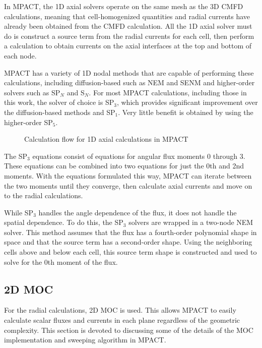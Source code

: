 In MPACT, the 1D axial solvers operate on the same mesh as the 3D CMFD calculations, meaning that cell-homogenized quantities and radial currents have already been obtained from the CMFD calculation.  All the 1D axial solver must do is construct a source term from the radial currents for each cell, then perform a calculation to obtain currents on the axial interfaces at the top and bottom of each node.

MPACT has a variety of 1D nodal methods that are capable of performing these calculations, including diffusion-based such as NEM and SENM and higher-order solvers such as SP$_N$ and S$_N$.  For most MPACT calculations, including those in this work, the solver of choice is SP$_3$, which provides significant improvement over the diffusion-based methods and SP$_1$.  Very little benefit is obtained by using the higher-order SP$_5$.

\begin{figure}[h]
  \centering
  
  \caption{Calculation flow for 1D axial calculations in MPACT}\label{f:Axial-flowchart}
\end{figure}

The SP$_3$ equations consist of equations for angular flux moments 0 through 3.  These equations can be combined into two equations for just the 0th and 2nd moments.  With the equations formulated this way, MPACT can iterate between the two moments until they converge, then calculate axial currents and move on to the radial calculations.

While SP$_3$ handles the angle dependence of the flux, it does not handle the spatial dependence.  To do this, the SP$_3$ solvers are wrapped in a two-node NEM solver.  This method assumes that the flux has a fourth-order polynomial shape in space and that the source term has a second-order shape.  Using the neighboring cells above and below each cell, this source term shape is constructed and used to solve for the 0th moment of the flux.

\subsection{2D MOC}

For the radial calculations, 2D MOC is used.  This allows MPACT to easily calculate scalar fluxes and currents in each plane regardless of the geometric complexity.  This section is devoted to discussing some of the details of the MOC implementation and sweeping algorithm in MPACT.

